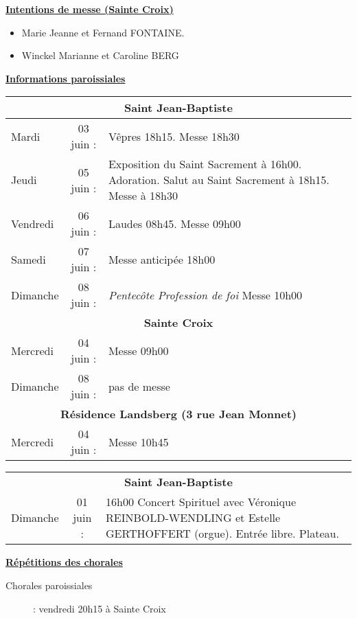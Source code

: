 \documentclass[11pt,a4paper]{article}
\newcommand{\NewsItem}[1]{%
\vspace{3pt}
\underline{\textbf{#1}}
		  }
\begin{document}
\newpage


\NewsItem{Intentions de messe (Sainte Croix)}
\begin{itemize}
\item[\Cross]
Marie Jeanne et Fernand FONTAINE.
\item[\Cross]
Winckel Marianne et Caroline BERG
\end{itemize}

\NewsItem{Informations paroissiales}

\begin{tabular} {lcp{8cm}}
\multicolumn{3}{c}{\textbf{Saint Jean-Baptiste} } \\ \hline
Mardi    & 03 juin : & Vêpres 18h15. Messe 18h30 \\ \hline
Jeudi    & 05 juin : & 
Exposition du Saint Sacrement à 16h00. Adoration. Salut au Saint Sacrement à 18h15. Messe à 18h30 
 \\ \hline
Vendredi & 06 juin : & Laudes 08h45. Messe 09h00 \\ \hline
Samedi   & 07 juin : & Messe anticipée 18h00 \\ \hline
Dimanche & 08 juin : & \emph{Pentecôte} \textit{Profession de foi} Messe 10h00 \\ \hline
\multicolumn{3}{c}{\textbf{Sainte Croix} } \\ \hline
Mercredi & 04 juin : & Messe 09h00 \\ \hline
Dimanche & 08 juin : & pas de messe \\ \hline
\multicolumn{3}{c}{\textbf{Résidence Landsberg (3 rue Jean Monnet)} } \\ \hline
Mercredi & 04 juin : & Messe 10h45 \\ \hline
\end{tabular}

\begin{framed}
\begin{tabular} {lcp{8cm}}
\multicolumn{3}{c}{\textbf{Saint Jean-Baptiste} } \\
Dimanche & 01 juin : & 16h00 Concert Spirituel avec Véronique REINBOLD-WENDLING et Estelle GERTHOFFERT (orgue). Entrée libre. Plateau.
\end{tabular}
\end{framed}


\NewsItem{Répétitions des chorales}
\begin{description}
\item[Chorales paroissiales] : vendredi 20h15 à Sainte Croix
\end{description}
\end{document}
